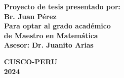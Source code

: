 \documentclass[12pt,a4]{article}
\begin{document}
\begin{titlepage}
\begin{center}
\begin{Large}
\end{Large}

\vspace*{0.15cm}

\begin{large}

\begin{flushright}
 \textbf {Proyecto de tesis presentado por:\\
 \vspace*{0.4cm}
Br. Juan Pérez\\
\vspace*{0.4cm}
Para optar al grado académico\\ de Maestro en Matemática\\
\vspace*{0.4cm}
Asesor: Dr. Juanito Arias }\\

\end{flushright}

\vspace*{0.7cm}

\begin{center}
\textbf{CUSCO-PERU\\
	2024}
\end{center}





\end{large}

\vspace*{0.3in}

\vspace*{0.1in}



\end{center}

\end{titlepage}
\end{document}
